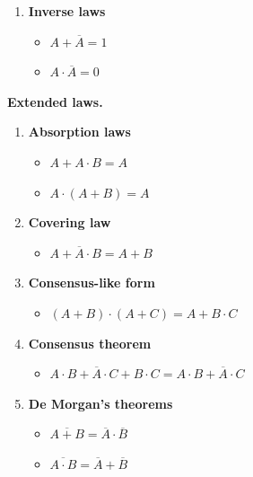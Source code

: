 \documentclass[11pt,a4paper]{article}
\providecommand{\tightlist}{\setlength{\itemsep}{1pt}\setlength{\parskip}{0pt}}
\begin{document}
\begin{enumerate}
  \begin{itemize}
  \tightlist
  \item
    \(A + A = A\)
  \item
    \(A \cdot A = A\)
  \end{itemize}
\item
  \textbf{Inverse laws}

  \begin{itemize}
  \tightlist
  \item
    \(A + \overline{A} = 1\)
  \item
    \(A \cdot \overline{A} = 0\)
  \end{itemize}
\end{enumerate}

\textbf{Extended laws.}

\begin{enumerate}
\def\labelenumi{\arabic{enumi}.}
\tightlist
\item
  \textbf{Absorption laws}

  \begin{itemize}
  \tightlist
  \item
    \(A + A \cdot B = A\)
  \item
    \(A \cdot (A + B) = A\)
  \end{itemize}
\item
  \textbf{Covering law}

  \begin{itemize}
  \tightlist
  \item
    \(A+\overline{A} \cdot B = A + B\)
  \end{itemize}
\item
  \textbf{Consensus-like form}

  \begin{itemize}
  \tightlist
  \item
    \((A + B) \cdot (A + C) = A + B \cdot C\)
  \end{itemize}
\item
  \textbf{Consensus theorem}

  \begin{itemize}
  \tightlist
  \item
    \(A \cdot B + \overline{A} \cdot C + B \cdot C = A \cdot B + \overline{A} \cdot C\)
  \end{itemize}
\item
  \textbf{De Morgan's theorems}

  \begin{itemize}
  \tightlist
  \item
    \(\overline{A + B} = \overline{A} \cdot \overline{B}\)
  \item
    \(\overline{A \cdot B} = \overline{A} + \overline{B}\)
  \end{itemize}
\end{enumerate}
\end{document}
